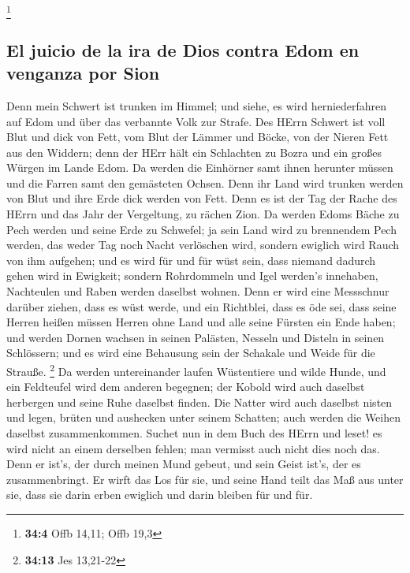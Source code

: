 \footnote{\textbf{34:4} Offb 14,11; Offb 19,3}

\hypertarget{el-juicio-de-la-ira-de-dios-contra-edom-en-venganza-por-sion}{%
\subsection{El juicio de la ira de Dios contra Edom en venganza por
Sion}\label{el-juicio-de-la-ira-de-dios-contra-edom-en-venganza-por-sion}}

 Denn mein Schwert ist trunken im Himmel; und siehe, es
wird herniederfahren auf Edom und über das verbannte Volk zur Strafe.
 Des HErrn Schwert ist voll Blut und dick von Fett, vom
Blut der Lämmer und Böcke, von der Nieren Fett aus den Widdern; denn der
HErr hält ein Schlachten zu Bozra und ein großes Würgen im Lande Edom.
 Da werden die Einhörner samt ihnen herunter müssen und
die Farren samt den gemästeten Ochsen. Denn ihr Land wird trunken werden
von Blut und ihre Erde dick werden von Fett.  Denn es ist
der Tag der Rache des HErrn und das Jahr der Vergeltung, zu rächen Zion.
 Da werden Edoms Bäche zu Pech werden und seine Erde zu
Schwefel; ja sein Land wird zu brennendem Pech werden, 
das weder Tag noch Nacht verlöschen wird, sondern ewiglich wird Rauch
von ihm aufgehen; und es wird für und für wüst sein, dass niemand
dadurch gehen wird in Ewigkeit;  sondern Rohrdommeln und
Igel werden's innehaben, Nachteulen und Raben werden daselbst wohnen.
Denn er wird eine Messschnur darüber ziehen, dass es wüst werde, und ein
Richtblei, dass es öde sei,  dass seine Herren heißen
müssen Herren ohne Land und alle seine Fürsten ein Ende haben;
 und werden Dornen wachsen in seinen Palästen, Nesseln
und Disteln in seinen Schlössern; und es wird eine Behausung sein der
Schakale und Weide für die Strauße. \footnote{\textbf{34:13} Jes
  13,21-22}  Da werden untereinander laufen Wüstentiere
und wilde Hunde, und ein Feldteufel wird dem anderen begegnen; der
Kobold wird auch daselbst herbergen und seine Ruhe daselbst finden.
 Die Natter wird auch daselbst nisten und legen, brüten
und aushecken unter seinem Schatten; auch werden die Weihen daselbst
zusammenkommen.  Suchet nun in dem Buch des HErrn und
leset! es wird nicht an einem derselben fehlen; man vermisst auch nicht
dies noch das. Denn er ist's, der durch meinen Mund gebeut, und sein
Geist ist's, der es zusammenbringt.  Er wirft das Los für
sie, und seine Hand teilt das Maß aus unter sie, dass sie darin erben
ewiglich und darin bleiben für und für.

